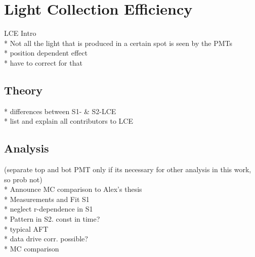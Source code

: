
\section{Light Collection Efficiency}
\label{sec:LCE}


LCE Intro \\
* Not all the light that is produced in a certain spot is seen by the PMTs \\
* position dependent effect \\
* have to correct for that

\subsection{Theory}

* differences between S1- \& S2-LCE \\
* list and explain all contributors to LCE

\subsection{Analysis}
(separate top and bot PMT only if its necessary for other analysis in this work, so prob not)
~\\

* Announce MC comparison to Alex's thesis \\
* Measurements and Fit S1 \\
* neglect r-dependence in S1 \\
* Pattern in S2. const in time? \\
* typical AFT \\
* data drive corr. possible? \\
* MC comparison




